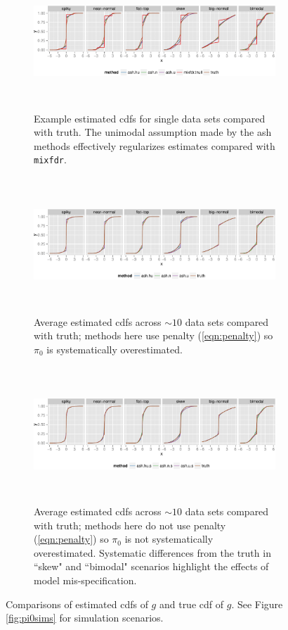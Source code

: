 \documentclass[11pt]{article}
\def\mixfdr{{\tt mixfdr}\xspace}
\begin{document}
\begin{figure}[h!] 
\begin{subfigure}{\textwidth}
	\includegraphics[height=2in]{../analysis/figure/plot_cdf_eg.Rmd/egcdf-1.pdf}
	\caption{Example estimated cdfs for single data sets compared with truth. The unimodal assumption made by the ash methods effectively regularizes estimates compared with \mixfdr.}
\end{subfigure}
\begin{subfigure}{\textwidth}
\includegraphics[height=2in]{../analysis/figure/plot_cdf_eg.Rmd/mean_cdf-1.pdf}
\caption{Average estimated cdfs across $\sim10$ data sets compared with truth; methods here use penalty (\ref{eqn:penalty}) so $\pi_0$ is systematically overestimated.}
\end{subfigure}
\begin{subfigure}{\textwidth}
\includegraphics[height=2in]{../analysis/figure/plot_cdf_eg.Rmd/mean_cdf_nopen-1.pdf}
\caption{Average estimated cdfs across $\sim10$ data sets compared with truth; methods here do not use penalty (\ref{eqn:penalty}) so $\pi_0$ is not systematically overestimated. Systematic differences from the truth in ``skew" and ``bimodal" scenarios highlight the effects of model mis-specification.}
\end{subfigure}
\caption{Comparisons of estimated cdfs of $g$ and true cdf of $g$. See Figure \ref{fig:pi0sims} for simulation scenarios.} \label{fig:egcdf}
\end{figure}
\end{document}
